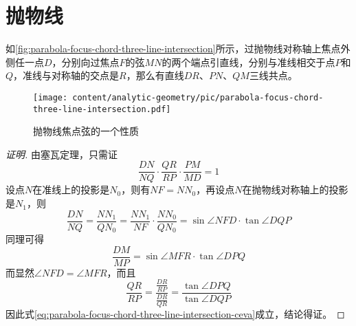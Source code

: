 
\section{抛物线}
\label{sec:para-curve}

\begin{property}
  如\autoref{fig:parabola-focus-chord-three-line-intersection}所示，过抛物线对称轴上焦点外侧任一点$D$，分别向过焦点$F$的弦$MN$的两个端点引直线，分别与准线相交于点$P$和$Q$，准线与对称轴的交点是$R$，那么有直线$DR$、$PN$、$QM$三线共点。
\end{property}

\begin{figure}[htbp]
  \centering
\texttt{[image: content/analytic-geometry/pic/parabola-focus-chord-three-line-intersection.pdf]}
\caption{抛物线焦点弦的一个性质}
\label{fig:parabola-focus-chord-three-line-intersection}
\end{figure}

\begin{proof}[证明]
  由塞瓦定理，只需证
  \begin{equation}
    \label{eq:parabola-focus-chord-three-line-intersection-ceva}
  \frac{DN}{NQ} \cdot \frac{QR}{RP} \cdot \frac{PM}{MD} = 1 
  \end{equation}
  设点$N$在准线上的投影是$N_0$，则有$NF=NN_0$，再设点$N$在抛物线对称轴上的投影是$N_1$，则
  \[ \frac{DN}{NQ} = \frac{NN_1}{QN_0} = \frac{NN_1}{NF} \cdot \frac{NN_0}{QN_0} = \sin{\angle NFD} \cdot \tan{\angle DQP} \]
  同理可得
  \[ \frac{DM}{MP} = \sin{\angle MFR} \cdot \tan{\angle DPQ} \]
  而显然$\angle NFD = \angle MFR$，而且
  \[ \frac{QR}{RP} = \frac{\frac{DR}{RP}}{\frac{DR}{QR}} = \frac{\tan{\angle DPQ}}{\tan{\angle DQP}} \]
  因此式\ref{eq:parabola-focus-chord-three-line-intersection-ceva}成立，结论得证。
\end{proof}

